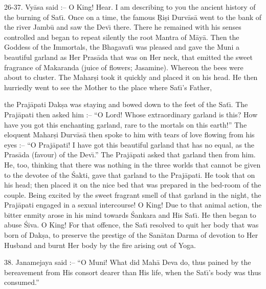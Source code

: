 26-37. Vy\=asa said :-- O King! Hear. I am describing to you the ancient history of the burning of Sat\={\i}. Once on a time, the famous \d{R}i\d{s}i Durv\=as\=a went to the bank of the river Jamb\=u and saw the Dev\={\i} there. There he remained with his senses controlled and began to repeat silently the root Mantra of M\=ay\=a. Then the Goddess of the Immortals, the Bhagavat\={\i} was pleased and gave the Muni a beautiful garland as Her Pras\=ada that was on Her neck, that emitted the sweet fragrance of Makaranda (juice of flowers; Jasamine). Whereon the bees were about to cluster. The Mahar\d{s}i took it quickly and placed it on his head. He then hurriedly went to see the Mother to the place where Sat\={\i}'s Father,

the Praj\=apati Dak\d{s}a was staying and bowed down to the feet of the Sat\={\i}. The Praj\=apati then asked him :-- ``O Lord! Whose extraordinary garland is this? How have you got this enchanting garland, rare to the mortals on this earth!'' The eloquent Mahar\d{s}i Durv\=as\=a then spoke to him with tears of love flowing from his eyes :-- ``O Praj\=apati! I have got this beautiful garland that has no equal, as the Pras\=ada (favour) of the Dev\={\i}.'' The Praj\=apati asked that garland then from him. He, too, thinking that there was nothing in the three worlds that cannot be given to the devotee of the \'Sakti, gave that garland to the Praj\=apati. He took that on his head; then placed it on the nice bed that was prepared in the bed-room of the couple. Being excited by the sweet fragrant smell of that garland in the night, the Praj\=apati engaged in a sexual intercourse! O King! Due to that animal action, the bitter enmity arose in his mind towards \'Sankara and His Sat\={\i}. He then began to abuse \'Siva. O King! For that offence, the Sat\={\i} resolved to quit her body that was born of Dak\d{s}a, to preserve the prestige of the San\=atan Darma of devotion to Her Husband and burnt Her body by the fire arising out of Yoga.

38. Janamejaya said :-- ``O Muni! What did Mah\=a Deva do, thus pained by the bereavement from His consort dearer than His life, when the Sat\={\i}'s body was thus consumed.''

